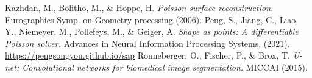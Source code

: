 \documentclass[a4paper,11pt]{article}
\begin{document}


\vspace{-1.5em}
\renewcommand{\refname}{\normalsize Références}
%
\begin{thebibliography}{99}
\vspace{-1em}
{\scriptsize
{}
	Kazhdan, M., Bolitho, M., \& Hoppe, H.
		{\it Poisson surface reconstruction.}
		Eurographics Symp. on Geometry processing (2006).
	Peng, S., Jiang, C., Liao, Y., Niemeyer, M., Pollefeys, M., \& Geiger, A.
		{\it Shape as points: A differentiable Poisson solver.}
		Advances in Neural Information Processing Systems, (2021).
		\hspace{2em}\url{https://pengsongyou.github.io/sap}
	Ronneberger, O., Fischer, P., \& Brox, T.
		{\it U-net: Convolutional networks for biomedical image segmentation.}
		MICCAI (2015).

%
%
%
%
%
}
\end{thebibliography}
\end{document}

